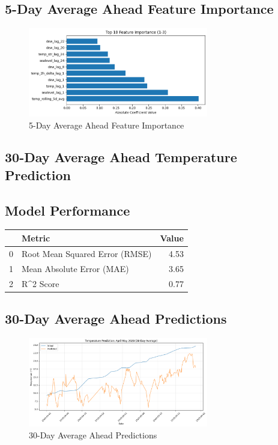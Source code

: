 \subsection{5-Day Average Ahead Feature Importance}
\begin{figure}[htbp]
\centering
\includegraphics[width=0.7\textwidth]{1-3-linear_temp_shift_feature_importance.png}
\caption{5-Day Average Ahead Feature Importance}
\label{fig:5-day_average_ahead_featimp}
\end{figure}



\subsection{30-Day Average Ahead Temperature Prediction}
\subsection{Model Performance}
\begin{tabular}{llr}
\toprule
 & Metric & Value \\
\midrule
0 & Root Mean Squared Error (RMSE) & 4.53 \\
1 & Mean Absolute Error (MAE) & 3.65 \\
2 & R^2 Score & 0.77 \\
\bottomrule
\end{tabular}

\subsection{30-Day Average Ahead Predictions}
\begin{figure}[htbp]
\centering
\includegraphics[width=0.7\textwidth]{1-4-linear_temp_shift_results.png}
\caption{30-Day Average Ahead Predictions}
\label{fig:30-day_average_ahead_pred}
\end{figure}

